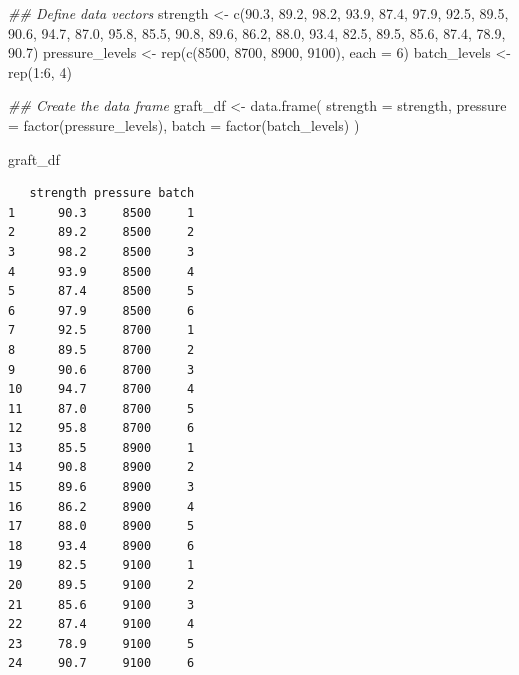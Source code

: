 \documentclass[
  letterpaper,
]{scrbook}
\newenvironment{Shaded}{\begin{snugshade}}{\end{snugshade}}
\newcommand{\AttributeTok}[1]{\textcolor[rgb]{0.40,0.45,0.13}{#1}}
\newcommand{\DecValTok}[1]{\textcolor[rgb]{0.68,0.00,0.00}{#1}}
\newcommand{\DocumentationTok}[1]{\textcolor[rgb]{0.37,0.37,0.37}{\textit{#1}}}
\newcommand{\FloatTok}[1]{\textcolor[rgb]{0.68,0.00,0.00}{#1}}
\newcommand{\FunctionTok}[1]{\textcolor[rgb]{0.28,0.35,0.67}{#1}}
\newcommand{\NormalTok}[1]{\textcolor[rgb]{0.00,0.23,0.31}{#1}}
\newcommand{\OtherTok}[1]{\textcolor[rgb]{0.00,0.23,0.31}{#1}}
\newcommand{\SpecialCharTok}[1]{\textcolor[rgb]{0.37,0.37,0.37}{#1}}
\begin{document}
\begin{Shaded}
\begin{Highlighting}[]
\DocumentationTok{\#\# Define data vectors}
\NormalTok{strength }\OtherTok{\textless{}{-}} \FunctionTok{c}\NormalTok{(}\FloatTok{90.3}\NormalTok{, }\FloatTok{89.2}\NormalTok{, }\FloatTok{98.2}\NormalTok{, }\FloatTok{93.9}\NormalTok{, }\FloatTok{87.4}\NormalTok{, }\FloatTok{97.9}\NormalTok{,}
              \FloatTok{92.5}\NormalTok{, }\FloatTok{89.5}\NormalTok{, }\FloatTok{90.6}\NormalTok{, }\FloatTok{94.7}\NormalTok{, }\FloatTok{87.0}\NormalTok{, }\FloatTok{95.8}\NormalTok{,}
              \FloatTok{85.5}\NormalTok{, }\FloatTok{90.8}\NormalTok{, }\FloatTok{89.6}\NormalTok{, }\FloatTok{86.2}\NormalTok{, }\FloatTok{88.0}\NormalTok{, }\FloatTok{93.4}\NormalTok{,}
              \FloatTok{82.5}\NormalTok{, }\FloatTok{89.5}\NormalTok{, }\FloatTok{85.6}\NormalTok{, }\FloatTok{87.4}\NormalTok{, }\FloatTok{78.9}\NormalTok{, }\FloatTok{90.7}\NormalTok{)}
\NormalTok{pressure\_levels }\OtherTok{\textless{}{-}} \FunctionTok{rep}\NormalTok{(}\FunctionTok{c}\NormalTok{(}\DecValTok{8500}\NormalTok{, }\DecValTok{8700}\NormalTok{, }\DecValTok{8900}\NormalTok{, }\DecValTok{9100}\NormalTok{), }\AttributeTok{each =} \DecValTok{6}\NormalTok{)}
\NormalTok{batch\_levels }\OtherTok{\textless{}{-}} \FunctionTok{rep}\NormalTok{(}\DecValTok{1}\SpecialCharTok{:}\DecValTok{6}\NormalTok{, }\DecValTok{4}\NormalTok{)}

\DocumentationTok{\#\# Create the data frame}
\NormalTok{graft\_df }\OtherTok{\textless{}{-}} \FunctionTok{data.frame}\NormalTok{(}
  \AttributeTok{strength =}\NormalTok{ strength,}
  \AttributeTok{pressure =} \FunctionTok{factor}\NormalTok{(pressure\_levels),}
  \AttributeTok{batch =} \FunctionTok{factor}\NormalTok{(batch\_levels)}
\NormalTok{)}


\NormalTok{graft\_df}
\end{Highlighting}
\end{Shaded}

\begin{verbatim}
   strength pressure batch
1      90.3     8500     1
2      89.2     8500     2
3      98.2     8500     3
4      93.9     8500     4
5      87.4     8500     5
6      97.9     8500     6
7      92.5     8700     1
8      89.5     8700     2
9      90.6     8700     3
10     94.7     8700     4
11     87.0     8700     5
12     95.8     8700     6
13     85.5     8900     1
14     90.8     8900     2
15     89.6     8900     3
16     86.2     8900     4
17     88.0     8900     5
18     93.4     8900     6
19     82.5     9100     1
20     89.5     9100     2
21     85.6     9100     3
22     87.4     9100     4
23     78.9     9100     5
24     90.7     9100     6
\end{verbatim}
\end{document}
